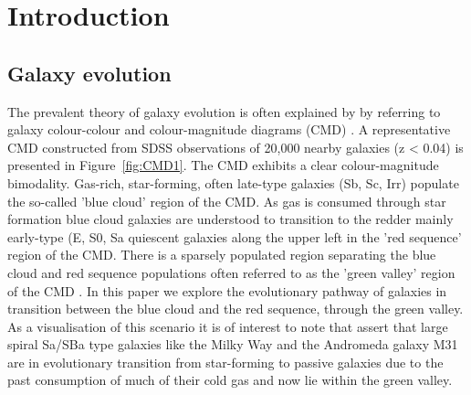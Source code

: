 \section{Introduction}
\label{sec:introduction}

% 

\subsection{Galaxy evolution}
\label{sec:evolution}

The prevalent theory of galaxy evolution is often explained  by  by referring to galaxy colour-colour and colour-magnitude diagrams (CMD) \citep[see e.g.][]{2001AJ....122.1861S, 2003ApJ...585L...5H, 2003ApJS..149..289B,baldry2004quantifying,2006MNRAS.373..469B}. A representative CMD constructed from SDSS observations of 20,000 nearby galaxies (z < 0.04)  is presented in  Figure~\ref{fig:CMD1}. The CMD exhibits a clear colour-magnitude bimodality.  Gas-rich, star-forming, often late-type galaxies (Sb, Sc, Irr) populate the so-called 'blue cloud' region of the CMD. As gas is consumed through star formation blue cloud galaxies are understood to transition to the redder mainly early-type (E, S0, Sa  quiescent galaxies along the upper left in the 'red sequence' region of the CMD. There is a sparsely populated region separating the blue cloud and red sequence populations often referred to as the 'green valley' region of the CMD  \citep{2004ApJ...608..752B}. In this paper we explore the evolutionary pathway of galaxies in transition between the blue cloud and the red sequence, through the green valley.
As a visualisation of this scenario it is of interest to note that \citet{Mutch_2011} assert that large spiral Sa/SBa type galaxies like the Milky Way and the Andromeda galaxy M31 are in evolutionary transition from star-forming to passive galaxies due to the past consumption of much of their cold gas and now lie within the green valley.

